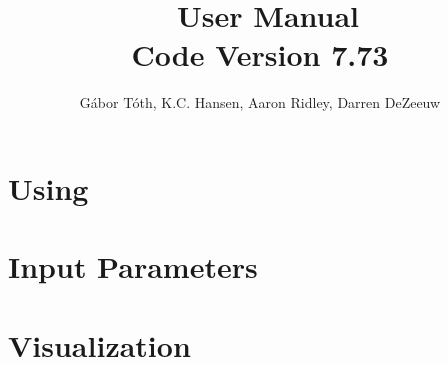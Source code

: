 \documentclass[twoside,10pt]{book}
\title{\BATSRUS\ User Manual \\ \large Code Version 7.73}
\author{G\'abor T\'oth, K.C. Hansen, Aaron Ridley, Darren DeZeeuw}
\begin{document}
\pagestyle{fancy}
\lhead[\fancyplain{}{\bfseries\thepage}]{\fancyplain{}{\bfseries\rightmark}}
\rhead[\fancyplain{}{\bfseries\leftmark}]{\fancyplain{}{\bfseries\thepage}}
\cfoot{}

\maketitle

\tableofcontents



\chapter{Using \BATSRUS \label{chapter:usage}}





\chapter{Input Parameters \label{chapter:param}}

%





\chapter{Visualization \label{chapter:visualization}}




\end{document}

